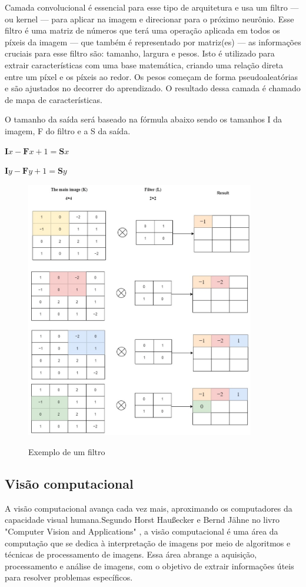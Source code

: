 \documentclass[
	12pt,				%
	openright,			%
	twoside,			%
	a4paper,			%
	english,			%
	french,				%
	spanish,			%
	brazil				%
	]{abntex2}
\begin{document}
Camada convolucional é essencial para esse tipo de arquitetura e usa um filtro — ou kernel — para aplicar na imagem e direcionar para o próximo neurônio. Esse filtro é uma matriz de números que terá uma operação aplicada em todos os píxeis da imagem — que também é representado por matriz(es) — as informações cruciais para esse filtro são: tamanho, largura e pesos. Isto é utilizado para extrair características com uma base matemática, criando uma relação direta entre um píxel e os píxeis ao redor. Os pesos começam de forma pseudoaleatórias e são ajustados no decorrer do aprendizado. O resultado dessa camada é chamado de mapa de características.

O tamanho da saída será baseado na fórmula abaixo sendo os tamanhos I da imagem, F do filtro e a S da saída.

$ \mathbf{I}x - \mathbf{F}x + 1 = \mathbf{S}x $

$ \mathbf{I}y - \mathbf{F}y + 1 = \mathbf{S}y $

\begin{figure}[H]
	\caption{Exemplo de um filtro}
	\centering %
	\includegraphics[width=10cm]{figures/exemplo_filtro.png} %
	\label{fig:exeplo_filtro}
\end{figure}

\subsection{Visão computacional}
A visão computacional avança cada vez mais, aproximando os computadores da capacidade visual humana.Segundo Horst Haußecker e Bernd Jähne no livro "Computer Vision and Applications" \cite{comp_vision_and_applications}, a visão computacional é uma área da computação que se dedica à interpretação de imagens por meio de algoritmos e técnicas de processamento de imagens. Essa área abrange a aquisição, processamento e análise de imagens, com o objetivo de extrair informações úteis para resolver problemas específicos.
\end{document}
